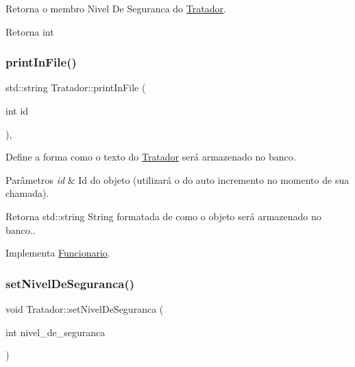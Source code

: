 Retorna o membro Nivel De Seguranca do \hyperlink{classTratador}{Tratador}. 

\begin{DoxyReturn}{Retorna}
int 
\end{DoxyReturn}
\mbox{\label{classTratador_af2efc58696c20320f51741d01a958ef7}} 
\subsubsection{\texorpdfstring{print\+In\+File()}{printInFile()}}
{\footnotesize\ttfamily std\+::string Tratador\+::print\+In\+File (\begin{DoxyParamCaption}\item[{int}]{id }\end{DoxyParamCaption})\hspace{0.3cm}{\ttfamily [protected]}, {\ttfamily [virtual]}}



Define a forma como o texto do \hyperlink{classTratador}{Tratador} será armazenado no banco. 


\begin{DoxyParams}{Parâmetros}
{\em id} & Id do objeto (utilizará o do auto incremento no momento de sua chamada). \\
\hline
\end{DoxyParams}
\begin{DoxyReturn}{Retorna}
std\+::string String formatada de como o objeto será armazenado no banco.. 
\end{DoxyReturn}


Implementa \hyperlink{classFuncionario_a696332cf5ccde3a31f84e5af687e7ec2}{Funcionario}.

\mbox{\label{classTratador_a508aa328b9235c262c74064c95357976}} 
\subsubsection{\texorpdfstring{set\+Nivel\+De\+Seguranca()}{setNivelDeSeguranca()}}
{\footnotesize\ttfamily void Tratador\+::set\+Nivel\+De\+Seguranca (\begin{DoxyParamCaption}\item[{int}]{nivel\+\_\+de\+\_\+seguranca }\end{DoxyParamCaption})}



